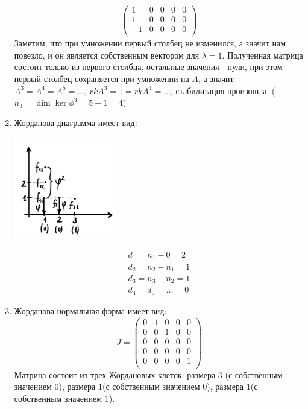 \begin{example}
\begin{enumerate}
\[\begin{pmatrix}
        1      & 0     & 0    & 0  & 0 \\
         1      & 0     & 0    & 0  & 0 \\
        -1     & 0     & 0    & 0  & 0 \\
        \end{pmatrix}\]
        Заметим, что при умножении первый столбец не изменился, 
        а значит нам повезло, и он является собственным вектором для $\lambda = 1$.
        Полученная матрица состоит только из первого столбца, остальные значения - нули, 
        при этом первый столбец сохраняется при умножении на $A$, а значит $A^3 = A^4 = A^5 = \dots$, $rk A^3 = 1 = rk A^4 = \dots$, стабилизация произошла. ($n_3 = \dim \ker \phi^3 = 5 - 1 = 4$)
        \item Жорданова диаграмма имеет вид:
        \begin{center}
            \includegraphics[width = 0.35\textwidth]{images/lec6_3.PNG}
        \end{center}
        \begin{eqnarray}
            d_1 = n_1 - 0 = 2   \\
            d_2 = n_2 - n_1 = 1 \\
            d_3 = n_3 - n_2 = 1 \\
            d_4 = d_5 = \dots = 0
        \end{eqnarray}
        \item Жорданова нормальная форма имеет вид:
         \[J = \begin{pmatrix}
        0      & 1     & 0    & 0  & 0 \\
        0      & 0     & 1    & 0  & 0 \\
        0      & 0     & 0    & 0  & 0 \\
         0      & 0     & 0    & 0  & 0 \\
        0     & 0     & 0    & 0  & 1 \\
        \end{pmatrix}\]
        Матрица состоит из трех Жордановых клеток: размера $3$ (с собственным значением $0$), размера $1$(с собственным значением $0$), размера $1$(с собственным значением $1$).\\

\end{enumerate}
\end{example}
